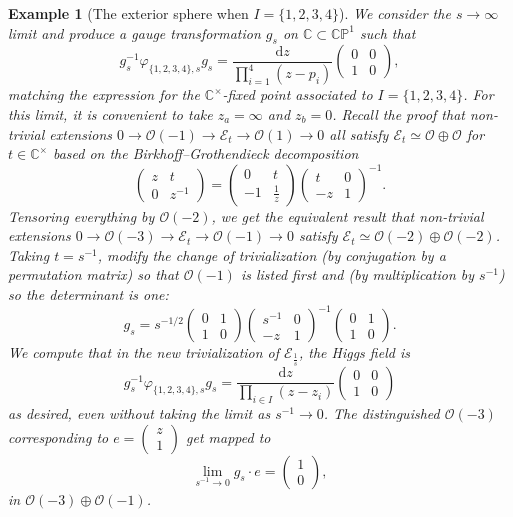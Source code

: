 \documentclass[12pt,letterpaper,reqno]{amsart}
\newtheorem{ex}[thm]{Example}
\theoremstyle{remark}
\theoremstyle{definition}
\numberwithin{thm}{section}
\numberwithin{equation}{section}
\numberwithin{figure}{section}
\newcommand{\cO}{\ensuremath{\mathcal O}}
\newcommand{\C}{\ensuremath{\mathbb C}}
\newcommand{\CP}{\ensuremath{\mathbb {CP}}}
\newcommand{\cE}{{\mathcal E}}
\newcommand{\de}{\mathrm{d}}
\begin{document}
\begin{ex}[The exterior sphere when $I=\{1, 2, 3, 4\}$]
We consider the $s \to \infty$ limit and produce a gauge transformation $g_s$ on $\C \subset \CP^1$ such that 
\[ g_s^{-1} \varphi_{\{1, 2, 3, 4\}, s}  g_s =  \frac{\de z}{\prod_{i=1}^4 (z-p_i)} \begin{pmatrix} 0 & 0 \\ 1 & 0 \end{pmatrix},\]
matching the expression for the $\C^\times$-fixed point associated to $I=\{1, 2, 3, 4\}$.  
For this limit, it is convenient to take $z_a=\infty$ and $z_b =0$.
Recall the proof that non-trivial extensions $0 \rightarrow \cO(-1) \rightarrow \cE_t \rightarrow \cO(1) \rightarrow 0$ all satisfy $\cE_t \simeq \cO \oplus \cO$ for $t \in \C^\times$ based on the Birkhoff--Grothendieck decomposition 
\[ \begin{pmatrix} z & t \\ 0 & z^{-1} \end{pmatrix} = \begin{pmatrix} 0 & t \\ -1 & \frac{1}{z} \end{pmatrix} \begin{pmatrix}t & 0 \\ -z & 1 \end{pmatrix}^{-1}. \]
Tensoring everything by $\cO(-2)$, we get the equivalent result that non-trivial extensions  $0 \rightarrow \cO(-3) \rightarrow \cE_t \rightarrow \cO(-1) \rightarrow 0$ satisfy $\cE_t \simeq \cO(-2) \oplus \cO(-2)$. 
Taking $t=s^{-1}$,
modify the change of trivialization (by conjugation by a permutation matrix) so that $\cO(-1)$ is listed first and (by multiplication by $s^{-1}$) so the determinant is one: \[g_s=s^{-1/2} \begin{pmatrix} 0 & 1 \\ 1 & 0 \end{pmatrix}  \begin{pmatrix}s^{-1}& 0 \\ -z & 1 \end{pmatrix}^{-1} \begin{pmatrix} 0 & 1 \\ 1 & 0 \end{pmatrix}.\]
We compute that in the new trivialization of $\cE_{\frac{1}{s}}$, the Higgs field is 
\[ g_s^{-1} \varphi_{\{1, 2, 3, 4\}, s}  g_s =  \frac{\de z}{\prod_{i \in I} (z-z_i)} \begin{pmatrix} 0 & 0 \\ 1 & 0 \end{pmatrix}\]
as desired, even without taking the limit as $s^{-1} \to 0$.
The distinguished $\cO(-3)$ corresponding to $e=\begin{pmatrix} z\\ 1 \end{pmatrix}$ get mapped to 
\[ \lim_{s^{-1} \to 0} g_s \cdot e = \begin{pmatrix} 1 \\ 0 \end{pmatrix}, \]
in $\mathcal{O}(-3) \oplus \mathcal{O}(-1)$.


\end{ex}
\end{document}
